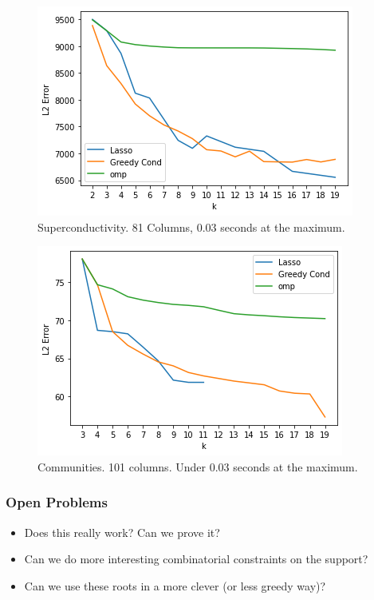\documentclass{beamer}
\begin{document}
\begin{frame}
    \begin{figure}[h]
        \centering
        \includegraphics[width=0.8\linewidth]{superconductivity.png}
        \caption{Superconductivity. 81 Columns, 0.03 seconds at the maximum.}%
        \label{fig:superconductivity}
    \end{figure}
\end{frame}
\begin{frame}
    \begin{figure}[h]
        \centering
        \includegraphics[width=0.8\linewidth]{violentcrime.png}
        \caption{Communities. 101 columns. Under 0.03 seconds at the maximum.}%
        \label{fig:name}
    \end{figure}
\end{frame}
\begin{frame}
    \frametitle{Open Problems}
    \begin{itemize}
        \item Does this really work? Can we prove it?
        \item Can we do more interesting combinatorial constraints on the support?
        \item Can we use these roots in a more clever (or less greedy way)?
    \end{itemize}
\end{frame}
\end{document}
